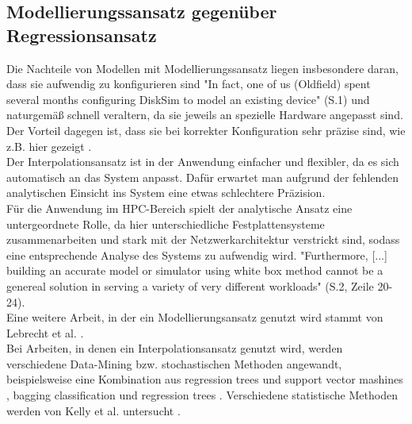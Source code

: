 \documentclass[
	12pt,
	a4paper,
	BCOR10mm,
	DIV14,
	listof=totoc,
	bibliography=totoc,
	headsepline
]{scrreprt}
\begin{document}
\subsection{Modellierungssansatz gegenüber Regressionsansatz}
	Die Nachteile von Modellen mit Modellierungssansatz liegen insbesondere daran, dass sie aufwendig zu konfigurieren sind "In fact, one of us (Oldfield) spent several months configuring DiskSim to model an existing device" \cite{Crume:2013:FML:2538542.2538561} (S.1) und naturgemäß schnell veraltern, da sie jeweils an spezielle Hardware angepasst sind. Der Vorteil dagegen ist, dass sie bei korrekter Konfiguration sehr präzise sind, wie z.B. hier gezeigt \cite{Ruemmler94anintroduction}. \\
	Der Interpolationsansatz ist in der Anwendung einfacher und flexibler, da es sich automatisch an das System anpasst. Dafür erwartet man aufgrund der fehlenden analytischen Einsicht ins System eine etwas schlechtere Präzision. \\ Für die Anwendung im HPC-Bereich spielt der analytische Ansatz eine untergeordnete Rolle, da hier unterschiedliche Festplattensysteme zusammenarbeiten und stark mit der Netzwerkarchitektur verstrickt sind, sodass eine entsprechende Analyse des Systems zu aufwendig wird. "Furthermore, [...] building an accurate model or simulator using white box method cannot be a genereal solution in serving a variety of very different workloads" \cite{DBLP:conf/npc/ZhangLZJC10} (S.2, Zeile 20-24).\\
	
	Eine weitere Arbeit, in der ein Modellierungsansatz genutzt wird stammt von Lebrecht et al. \cite{Lebrecht:2009:10.1109/QEST.2009.31}.\\ 
	Bei Arbeiten, in denen ein Interpolationsansatz genutzt wird, werden verschiedene Data-Mining bzw. stochastischen Methoden angewandt, beispielsweise eine Kombination aus regression trees und support vector mashines  \cite{Dai:2012:SDP:2477169.2477214}, bagging classification und regression trees \cite{DBLP:conf/npc/ZhangLZJC10}. Verschiedene statistische Methoden werden von Kelly et al. untersucht \cite{Kelly04inducingmodels}.\\
\end{document}
